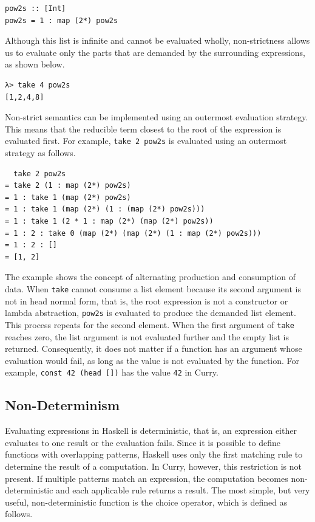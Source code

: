 \documentclass[a4paper, 11pt, fleqn, twoside, abstract=on]{scrreprt}
\newcommand{\hinl}[1]{\texttt{#1}}
\begin{document}
\begin{verbatim}
pow2s :: [Int]
pow2s = 1 : map (2*) pow2s
\end{verbatim}
\noindent
Although this list is infinite and cannot be evaluated wholly, non-strictness allows us to evaluate only the parts that are demanded by the surrounding expressions, as shown below.

\begin{verbatim}
λ> take 4 pow2s
[1,2,4,8]
\end{verbatim}

Non-strict semantics can be implemented using an outermost evaluation strategy.
This means that the reducible term closest to the root of the expression is evaluated first.
For example, \hinl{take 2 pow2s} is evaluated using an outermost strategy as follows.

\begin{verbatim}
  take 2 pow2s
= take 2 (1 : map (2*) pow2s)
= 1 : take 1 (map (2*) pow2s)
= 1 : take 1 (map (2*) (1 : (map (2*) pow2s)))
= 1 : take 1 (2 * 1 : map (2*) (map (2*) pow2s))
= 1 : 2 : take 0 (map (2*) (map (2*) (1 : map (2*) pow2s)))
= 1 : 2 : []
= [1, 2]
\end{verbatim}
\noindent
The example shows the concept of alternating production and consumption of data.
When \hinl{take} cannot consume a list element because its second argument is not in head normal form, that is, the root expression is not a constructor or lambda abstraction, \hinl{pow2s} is evaluated to produce the demanded list element.
This process repeats for the second element.
When the first argument of \hinl{take} reaches zero, the list argument is not evaluated further and the empty list is returned.
Consequently, it does not matter if a function has an argument whose evaluation would fail, as long as the value is not evaluated by the function.
For example, \hinl{const 42 (head [])} has the value \hinl{42} in Curry.

\subsection{Non-Determinism}
Evaluating expressions in Haskell is deterministic, that is, an expression either evaluates to one result or the evaluation fails.
Since it is possible to define functions with overlapping patterns, Haskell uses only the first matching rule to determine the result of a computation.
In Curry, however, this restriction is not present.
If multiple patterns match an expression, the computation becomes non-deterministic and each applicable rule returns a result.
The most simple, but very useful, non-deterministic function is the choice operator, which is defined as follows.
\end{document}
